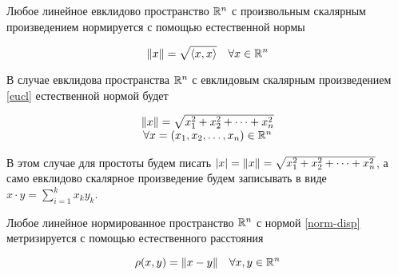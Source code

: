 \documentclass[../main.tex]{subfiles}
\begin{document}
\begin{thm}
 Любое линейное евклидово пространство $\mathbb{R}^n$ с произвольным скалярным
 произведением нормируется с помощью естественной нормы
 
 \begin{equation}
  \label{rn-norm}
  \lVert{x}\rVert = \sqrt{\left<x, x\right>} \quad \forall x \in \mathbb{R}^n
 \end{equation}
 
\end{thm}
\begin{rem}
 В случае евклидова пространства $\mathbb{R}^n$ с евклидовым скалярным 
 произведением \eqref{eucl} естественной нормой будет
 
 \[\begin{array}{c}
    \lVert{x}\rVert = \sqrt{x_1^2 + x_2^2 + \dots + x_n^2} \\
    \forall x = (x_1, x_2, \dots, x_n) \in \mathbb{R}^n
   \end{array}\]
   
 В этом случае для простоты будем писать $\left|{x}\right| = \lVert{x}\rVert = 
 \sqrt{x_1^2 + x_2^2 + \dots + x_n^2}$, а само евклидово скалярное
 произведение будем записывать в виде $x\cdot y = \sum\limits_{i=1}^k 
 x_ky_k$.

\end{rem}
\begin{thm}
 Любое линейное нормированное пространство $\mathbb{R}^n$ с нормой
 \eqref{norm-disp} метризируется с помощью естественного расстояния

 \begin{equation}
  \label{nat-dist}
  \rho(x, y) = \lVert{x-y}\rVert\quad \forall x, y \in \mathbb{R}^n
 \end{equation}
 
\end{thm}
\end{document}
